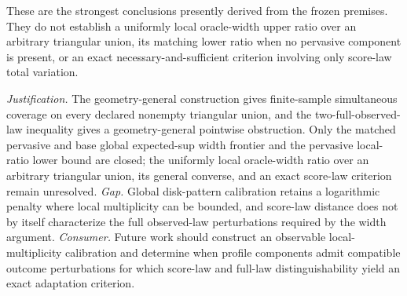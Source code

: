 \documentclass{article}
\begin{document}
These are the strongest conclusions presently derived from the frozen
premises.  They do not establish a uniformly local oracle-width upper
ratio over an arbitrary triangular union, its matching lower ratio when
no pervasive component is present, or an exact necessary-and-sufficient
criterion involving only score-law total variation.
\par\smallskip\noindent \textit{Justification.} The geometry-general construction gives finite-sample simultaneous coverage on every declared nonempty triangular union, and the two-full-observed-law inequality gives a geometry-general pointwise obstruction. Only the matched pervasive and base global expected-sup width frontier and the pervasive local-ratio lower bound are closed; the uniformly local oracle-width ratio over an arbitrary triangular union, its general converse, and an exact score-law criterion remain unresolved. \textit{Gap.} Global disk-pattern calibration retains a logarithmic penalty where local multiplicity can be bounded, and score-law distance does not by itself characterize the full observed-law perturbations required by the width argument. \textit{Consumer.} Future work should construct an observable local-multiplicity calibration and determine when profile components admit compatible outcome perturbations for which score-law and full-law distinguishability yield an exact adaptation criterion.
\end{document}
